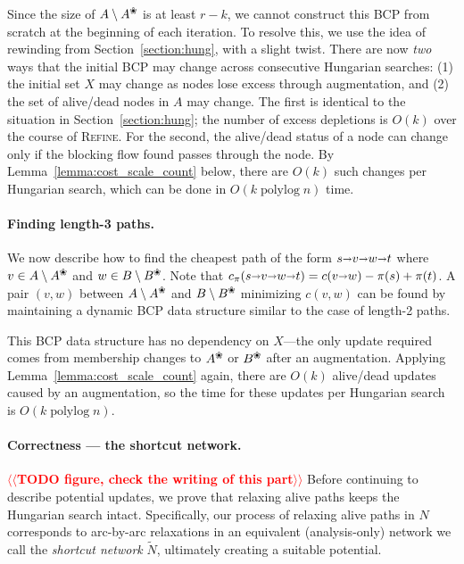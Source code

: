 \documentclass[11pt]{article}
\makeatletter
\def\polylog{\mathop{\mathrm{polylog}}}
\def\arcto{\mathord\shortrightarrow}
\def\arc#1#2{#1\arcto#2}
\def\alive#1{{#1}^\text{\ding{96}}}
\def\dead#1{{#1} \setminus \alive{#1}}
\numberwithin{figure}{section}
\def\EMPH#1{\textcolor{BrickRed}{{\emph{#1}}}}
\def\n@te#1{\textsf{\boldmath \textbf{$\langle\!\langle$#1$\rangle\!\rangle$}}\leavevmode}
\def\note#1{\textcolor{red}{\n@te{#1}}}
\makeatother
\begin{document}
Since the size of $\dead{A}$ is at least $r-k$, we cannot
construct this BCP from scratch at the beginning of each iteration.
To resolve this, we use the idea of rewinding from Section~\ref{section:hung},
with a slight twist.
There are now \emph{two} ways that the initial BCP may change across
consecutive Hungarian searches: (1) the initial set $X$ may change as nodes
lose excess through augmentation, and (2) the set of alive/dead nodes in $A$ may
change.
The first is identical to the situation in Section~\ref{section:hung};
the number of excess depletions is $O(k)$ over the course of \textsc{Refine}.
For the second, the alive/dead status of a node can change only if the
blocking flow found passes through the node.
By Lemma~\ref{lemma:cost_scale_count} below, there are $O(k)$ such changes per Hungarian search,
which can be done in $O(k\polylog n)$ time.

\paragraph*{Finding length-3 paths.}
We now describe how to find the cheapest path of the form $s \arcto v \arcto w \arcto t$
where $v \in \dead{A}$ and $w \in \dead{B}$.
Note that $c_\pi(s \arcto v \arcto w \arcto t) = c(\arc vw) - \pi(s) + \pi(t)$.
A pair $(v, w)$ between $\dead{A}$ and $\dead{B}$ minimizing $c(v, w)$
can be found by maintaining a dynamic BCP data structure similar to the
case of length-2 paths.

This BCP data structure has no dependency on $X$---the only update required comes from
membership changes to $\alive{A}$ or $\alive{B}$ after an augmentation.
Applying Lemma~\ref{lemma:cost_scale_count} again,
there are $O(k)$ alive/dead updates caused by an augmentation, so the time for
these updates per Hungarian search is $O(k\polylog n)$.


\paragraph*{Correctness --- the shortcut network.}
\note{TODO figure, check the writing of this part} %
Before continuing to describe potential updates, we prove that relaxing
alive paths keeps the Hungarian search intact.
Specifically, our process of relaxing alive paths in $N$ corresponds to
arc-by-arc relaxations in an equivalent (analysis-only) network we call the
\EMPH{shortcut network} $\tilde{N}$, ultimately creating a suitable potential.
\end{document}
